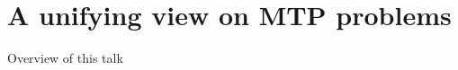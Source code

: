 \documentclass[]{beamer}
\newcommand{\bx}{\boldsymbol{x}}
\newcommand{\by}{\boldsymbol{y}}
\newcommand{\bh}{\boldsymbol{h}}
\renewcommand{\emph}[1]{\textbf{\color{putblue}#1}}
\begin{document}


\section{A unifying view on MTP problems}


\begin{frame}{Overview of this talk}

\tableofcontents

\end{frame}




%
\end{document}
